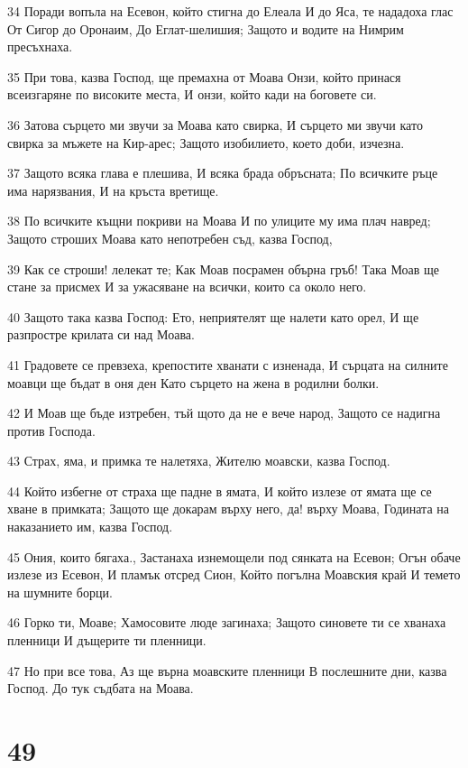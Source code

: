 \par 34 Поради вопъла на Есевон, който стигна до Елеала И до Яса, те нададоха глас От Сигор до Оронаим, До Еглат-шелишия; Защото и водите на Нимрим пресъхнаха.
\par 35 При това, казва Господ, ще премахна от Моава Онзи, който принася всеизгаряне по високите места, И онзи, който кади на боговете си.
\par 36 Затова сърцето ми звучи за Моава като свирка, И сърцето ми звучи като свирка за мъжете на Кир-арес; Защото изобилието, което доби, изчезна.
\par 37 Защото всяка глава е плешива, И всяка брада обръсната; По всичките ръце има нарязвания, И на кръста вретище.
\par 38 По всичките къщни покриви на Моава И по улиците му има плач навред; Защото строших Моава като непотребен съд, казва Господ,
\par 39 Как се строши! лелекат те; Как Моав посрамен обърна гръб! Така Моав ще стане за присмех И за ужасяване на всички, които са около него.
\par 40 Защото така казва Господ: Ето, неприятелят ще налети като орел, И ще разпростре крилата си над Моава.
\par 41 Градовете се превзеха, крепостите хванати с изненада, И сърцата на силните моавци ще бъдат в оня ден Като сърцето на жена в родилни болки.
\par 42 И Моав ще бъде изтребен, тъй щото да не е вече народ, Защото се надигна против Господа.
\par 43 Страх, яма, и примка те налетяха, Жителю моавски, казва Господ.
\par 44 Който избегне от страха ще падне в ямата, И който излезе от ямата ще се хване в примката; Защото ще докарам върху него, да! върху Моава, Годината на наказанието им, казва Господ.
\par 45 Ония, които бягаха., Застанаха изнемощели под сянката на Есевон; Огън обаче излезе из Есевон, И пламък отсред Сион, Който погълна Моавския край И темето на шумните борци.
\par 46 Горко ти, Моаве; Хамосовите люде загинаха; Защото синовете ти се хванаха пленници И дъщерите ти пленници.
\par 47 Но при все това, Аз ще върна моавските пленници В послешните дни, казва Господ. До тук съдбата на Моава.

\chapter{49}

